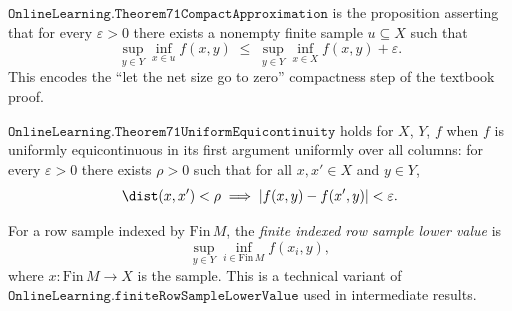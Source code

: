 \begin{definition}
\label{OnlineLearning.Theorem71CompactApproximation}
\leanok
{}
$\texttt{OnlineLearning.Theorem71CompactApproximation}$ is the proposition asserting that
for every $\varepsilon > 0$ there exists a nonempty finite sample $u \subseteq X$ such
that
\[
  \sup_{y \in Y} \inf_{x \in u} f(x, y)
    \;\le\;
  \sup_{y \in Y} \inf_{x \in X} f(x, y) + \varepsilon.
\]
This encodes the ``let the net size go to zero'' compactness step of the textbook proof.
\end{definition}

\begin{definition}
\label{OnlineLearning.Theorem71UniformEquicontinuity}
\leanok
$\texttt{OnlineLearning.Theorem71UniformEquicontinuity}$ holds for $X$, $Y$, $f$ when $f$
is uniformly equicontinuous in its first argument uniformly over all columns: for every
$\varepsilon > 0$ there exists $\rho > 0$ such that for all $x, x' \in X$ and $y \in Y$,
\[
  \dist(x, x') < \rho \;\Longrightarrow\; |f(x,y) - f(x',y)| < \varepsilon.
\]
\end{definition}

\begin{definition}
\label{OnlineLearning.finiteIndexedRowSampleLowerValue}
\leanok
For a row sample indexed by $\mathrm{Fin}\,M$, the \emph{finite indexed row sample lower
value} is
\[
  \sup_{y \in Y} \inf_{i \in \mathrm{Fin}\,M} f(x_i, y),
\]
where $x : \mathrm{Fin}\,M \to X$ is the sample.  This is a technical variant of
$\texttt{OnlineLearning.finiteRowSampleLowerValue}$ used in intermediate results.
\end{definition}


